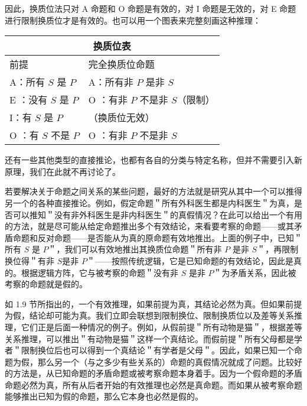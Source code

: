 因此，换质位法只对 A 命题和 O 命题是有效的，对 I 命题是无效的，对 E 命题进行限制换质位才是有效的。也可以用一个图表来完整刻画这种推理：

\begin{center}
\begin{tabular}{|l|l|}
\hline
\multicolumn{2}{|c|}{换质位表} \\
\hline
前提 & 完全换质位命题 \\
\hline
A：所有 $S$ 是 $P$ & A：所有非 $P$ 是非 $S$ \\
\hline
E ：没有 $S$ 是 $P$ & O ：有非 $P$ 不是非 $S$（限制） \\
\hline
I：有 $S$ 是 $P$ & （换质位无效） \\
\hline
O ：有 $S$ 不是 $P$ & O ：有非 $P$ 不是非 $S$ \\
\hline
\end{tabular}
\end{center}

还有一些其他类型的直接推论，也都有各自的分类与特定名称，但并不需要引入新原理，我们在此就不再讨论了。

若要解决关于命题之间关系的某些问题，最好的方法就是研究从其中一个可以推得另一个的各种直接推论。例如，假定命题＂所有外科医生都是内科医生＂为真，是否可以推知＂没有非外科医生是非内科医生＂的真假情况？在此可以给出一个有用的方法，就是尽可能从给定命题推出多个有效结论，来看要考察的命题——或其矛盾命题和反对命题——是否能从为真的原命题有效地推出。上面的例子中，已知＂所有 $S$ 是 $P$＂，我们可以有效地推出其换质位命题＂所有非 $P$ 是非 $S$＂，再限制换位得＂有非 $S$是非 $P$＂——按照传统逻辑，它是已知命题的有效结论，因此是真的。根据逻辑方阵，它与被考察的命题＂没有非 $S$ 是非 $P$＂为矛盾关系，因此被考察的命题就是假的。

如 1.9 节所指出的，一个有效推理，如果前提为真，其结论必然为真。但如果前提为假，结论却可能为真。我们立即会联想到限制换位、限制换质位以及差等关系推理，它们正是后面一种情况的例子。例如，从假前提＂所有动物是猫＂，根据差等关系推理，可以推出＂有动物是猫＂这样一个真结论。而假前提＂所有父母都是学者＂限制换位后也可以得到一个真结论＂有学者是父母＂。因此，如果已知一个命题为假，那么另一个（与之多少有些关系的）命题的真假情况就成了问题。比较好的方法是，从已知命题的矛盾命题或被考察命题本身着手。因为一个假命题的矛盾命题必然为真，所有从后者开始的有效推理也必然是真命题。而如果从被考察命题能够推出已知为假的命题，那么它本身也必然是假的。


